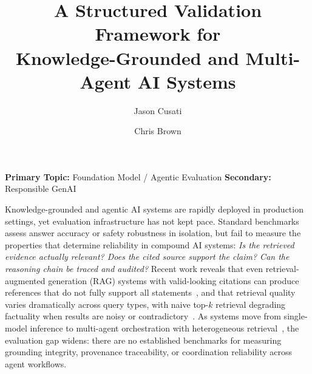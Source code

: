 \documentclass[conference, 10pt]{IEEEtran}
\title{A Structured Validation Framework for\\Knowledge-Grounded and Multi-Agent AI Systems}
\author{Jason Cusati \and Chris Brown}
\date{}
\begin{document}
\maketitle
\thispagestyle{empty}

\vspace{-1.5em}

\noindent\textbf{Primary Topic:} Foundation Model / Agentic Evaluation \hfill
\textbf{Secondary:} Responsible GenAI

\vspace{0.5em}

Knowledge-grounded and agentic AI systems are rapidly deployed in production settings, yet evaluation infrastructure has not kept pace. Standard benchmarks assess answer accuracy or safety robustness in isolation, but fail to measure the properties that determine reliability in compound AI systems: \textit{Is the retrieved evidence actually relevant? Does the cited source support the claim? Can the reasoning chain be traced and audited?} Recent work reveals that even retrieval-augmented generation (RAG) systems with valid-looking citations can produce references that do not fully support all statements~\cite{Ji2023HallucinationSurvey}, and that retrieval quality varies dramatically across query types, with naive top-$k$ retrieval degrading factuality when results are noisy or contradictory~\cite{Yan2024CRAG}. As systems move from single-model inference to multi-agent orchestration with heterogeneous retrieval~\cite{AWSBedrockHybridSearch2024,Edge2024GraphRAG}, the evaluation gap widens: there are no established benchmarks for measuring grounding integrity, provenance traceability, or coordination reliability across agent workflows.
\end{document}
